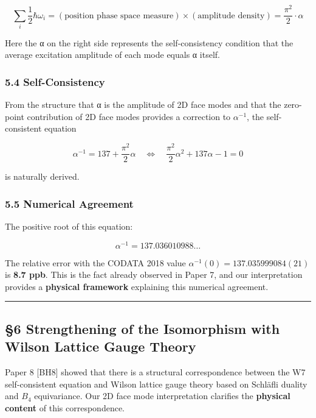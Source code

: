 \documentclass[
  11pt]{article}
\begin{document}
\[\sum_i \frac{1}{2}\hbar\omega_i = (\text{position phase space measure}) \times (\text{amplitude density}) = \frac{\pi^2}{2} \cdot \alpha\]

Here the α on the right side represents the self-consistency condition
that the average excitation amplitude of each mode equals α itself.

\subsubsection{5.4 Self-Consistency}\label{self-consistency}

From the structure that α is the amplitude of 2D face modes and that the
zero-point contribution of 2D face modes provides a correction to
\(\alpha^{-1}\), the self-consistent equation

\[\alpha^{-1} = 137 + \frac{\pi^2}{2}\alpha \quad \Leftrightarrow \quad \frac{\pi^2}{2}\alpha^2 + 137\alpha - 1 = 0\]

is naturally derived.

\subsubsection{5.5 Numerical Agreement}\label{numerical-agreement}

The positive root of this equation:

\[\alpha^{-1} = 137.036010988\ldots\]

The relative error with the CODATA 2018 value
\(\alpha^{-1}(0) = 137.035999084(21)\) is \textbf{8.7 ppb}. This is the
fact already observed in Paper 7, and our interpretation provides a
\textbf{physical framework} explaining this numerical agreement.

\begin{center}\rule{0.5\linewidth}{0.5pt}\end{center}

\subsection{§6 Strengthening of the Isomorphism with Wilson Lattice
Gauge
Theory}\label{strengthening-of-the-isomorphism-with-wilson-lattice-gauge-theory}

Paper 8 {[}BH8{]} showed that there is a structural correspondence
between the W7 self-consistent equation and Wilson lattice gauge theory
based on Schläfli duality and \(B_4\) equivariance. Our 2D face mode
interpretation clarifies the \textbf{physical content} of this
correspondence.
\end{document}
